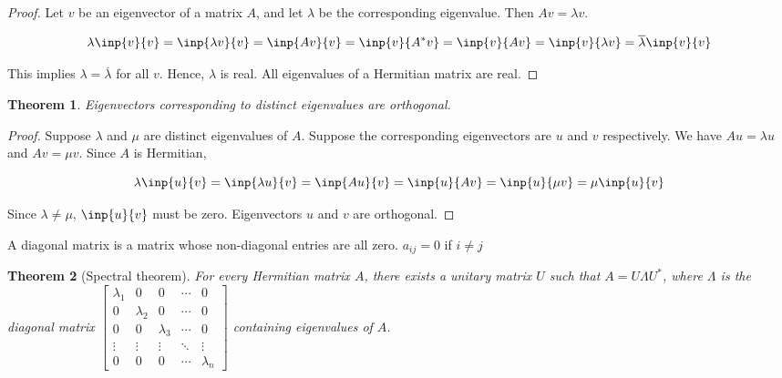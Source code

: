 \documentclass[twofold]{article}
\newcommand*\conj[1]{\overline{#1}}
\newcommand*\adj[1]{#1^*}
\theoremstyle{plain}
\newtheorem{theorem}{Theorem}
\theoremstyle{definition}
\theoremstyle{remark}
\begin{document}
\begin{proof}
Let \(v\) be an eigenvector of a matrix \(A\), and let \(\lambda\) be the corresponding eigenvalue. Then \(Av = \lambda v\). 

\[ \lambda\inp{v}{v} = \inp{\lambda v}{v} =  \inp{Av}{v} = \inp{v}{\adj{A}v} = \inp{v}{Av} = \inp{v}{\lambda v} = \conj{\lambda} \inp{v}{v}\]

This implies \(\lambda = \conj{\lambda}\) for all \(v\). Hence, \(\lambda\) is real. All eigenvalues of a Hermitian matrix are real.
 \end{proof}



\begin{theorem} Eigenvectors corresponding to distinct eigenvalues are orthogonal.\end{theorem}

\begin{proof} Suppose \(\lambda\) and \(\mu\) are distinct eigenvalues of \(A\). Suppose the corresponding eigenvectors are \(u\) and \(v\) respectively. We have \(Au = \lambda u\) and \(Av = \mu v\). Since \(A\) is Hermitian, 

\[ \lambda \inp{u}{v} = \inp{\lambda u}{v} = \inp{A u}{v} = \inp{u}{Av} = \inp{u}{\mu v} = \mu \inp{u}{v} \]

Since \(\lambda \ne \mu\), \(\inp{u}{v}\) must be zero. Eigenvectors \(u\) and \(v\) are orthogonal.

\end{proof}



A diagonal matrix is a matrix whose non-diagonal entries are all zero. \(a_{ij} = 0\) if \(i \ne j\)

\begin{theorem}[Spectral theorem]  For every Hermitian matrix \(A\), there exists a unitary matrix \(U\) such that \(A = U \Lambda \adj{U}\), where \(\Lambda\) is the diagonal matrix \(\begin{bmatrix}
\lambda_1 & 0 & 0 & \cdots & 0\\
0 & \lambda_2 & 0 & \cdots & 0\\
0 & 0 & \lambda_3 & \cdots & 0\\
\vdots & \vdots & \vdots & \ddots & \vdots \\
0 & 0 & 0 & \cdots & \lambda_n \end{bmatrix}\) containing eigenvalues of \(A\). \end{theorem}
\end{document}
